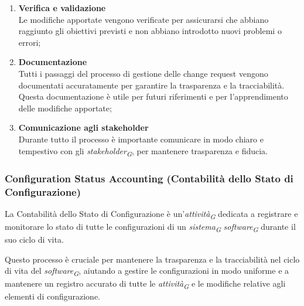 \begin{enumerate}
    \item \textbf{Verifica e validazione} \\
    Le modifiche apportate vengono verificate per assicurarsi che abbiano raggiunto gli obiettivi previsti e non abbiano introdotto nuovi problemi o errori;
    \item \textbf{Documentazione} \\
    Tutti i passaggi del processo di gestione delle change request vengono documentati accuratamente per garantire la trasparenza e la tracciabilità. Questa documentazione è utile per futuri riferimenti e per l'apprendimento delle modifiche apportate;
    \item \textbf{Comunicazione agli stakeholder} \\Durante tutto il processo è importante comunicare in modo chiaro e tempestivo con gli \textit{stakeholder}\textsubscript{\textit{G}}, per mantenere trasparenza e fiducia.
\end{enumerate}

\subsubsection{Configuration Status Accounting (Contabilità dello Stato di Configurazione)}
La Contabilità dello Stato di Configurazione è un'\textit{attività}\textsubscript{\textit{G}} dedicata a registrare e monitorare lo stato di tutte le configurazioni di un \textit{sistema}\textsubscript{\textit{G}} \textit{software}\textsubscript{\textit{G}} durante il suo ciclo di vita.

Questo processo è cruciale per mantenere la trasparenza e la tracciabilità nel ciclo di vita del \textit{software}\textsubscript{\textit{G}}, aiutando a gestire le configurazioni in modo uniforme e a mantenere un registro accurato di tutte le \textit{attività}\textsubscript{\textit{G}} e le modifiche relative agli elementi di configurazione.\\

